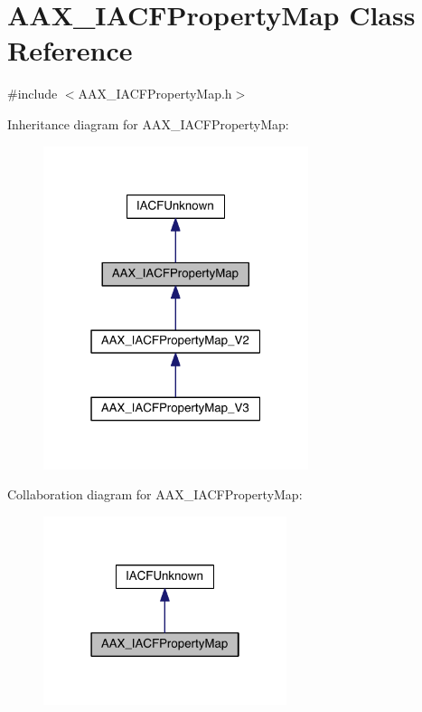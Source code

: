\hypertarget{a00079}{}\section{A\+A\+X\+\_\+\+I\+A\+C\+F\+Property\+Map Class Reference}
\label{a00079}


{\ttfamily \#include $<$A\+A\+X\+\_\+\+I\+A\+C\+F\+Property\+Map.\+h$>$}



Inheritance diagram for A\+A\+X\+\_\+\+I\+A\+C\+F\+Property\+Map\+:
\nopagebreak
\begin{figure}[H]
\begin{center}
\leavevmode
\includegraphics[width=220pt]{a00580}
\end{center}
\end{figure}


Collaboration diagram for A\+A\+X\+\_\+\+I\+A\+C\+F\+Property\+Map\+:
\nopagebreak
\begin{figure}[H]
\begin{center}
\leavevmode
\includegraphics[width=202pt]{a00581}
\end{center}
\end{figure}


